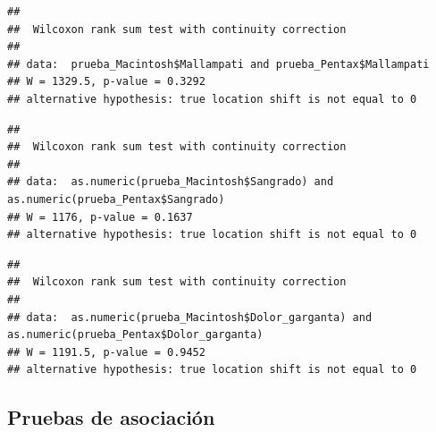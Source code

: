 \documentclass[
]{article}
\newenvironment{Shaded}{\begin{snugshade}}{\end{snugshade}}
\newcommand{\CommentTok}[1]{\textcolor[rgb]{0.56,0.35,0.01}{\textit{#1}}}
\newcommand{\FunctionTok}[1]{\textcolor[rgb]{0.13,0.29,0.53}{\textbf{#1}}}
\newcommand{\NormalTok}[1]{#1}
\newcommand{\SpecialCharTok}[1]{\textcolor[rgb]{0.81,0.36,0.00}{\textbf{#1}}}
\begin{document}
\begin{verbatim}
## 
##  Wilcoxon rank sum test with continuity correction
## 
## data:  prueba_Macintosh$Mallampati and prueba_Pentax$Mallampati
## W = 1329.5, p-value = 0.3292
## alternative hypothesis: true location shift is not equal to 0
\end{verbatim}

\begin{Shaded}
\end{Shaded}

\begin{verbatim}
## 
##  Wilcoxon rank sum test with continuity correction
## 
## data:  as.numeric(prueba_Macintosh$Sangrado) and as.numeric(prueba_Pentax$Sangrado)
## W = 1176, p-value = 0.1637
## alternative hypothesis: true location shift is not equal to 0
\end{verbatim}

\begin{Shaded}
\end{Shaded}

\begin{verbatim}
## 
##  Wilcoxon rank sum test with continuity correction
## 
## data:  as.numeric(prueba_Macintosh$Dolor_garganta) and as.numeric(prueba_Pentax$Dolor_garganta)
## W = 1191.5, p-value = 0.9452
## alternative hypothesis: true location shift is not equal to 0
\end{verbatim}

\hypertarget{pruebas-de-asociaciuxf3n}{%
\subsection{Pruebas de asociación}\label{pruebas-de-asociaciuxf3n}}
\end{document}
